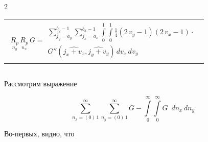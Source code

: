 \documentclass[twoside, 10pt]{article}
\def\myvspacebeforesubsection{-2.0mm}
\def\myvspaceaftersubsection{-2.5mm}
\begin{document}
\begin{multicols}{2}
\begin{center}
\begin{tabular}{ l }


$\begin{array}{lr}
\underset{n_y}{R_{p}}\,\underset{n_x}{R_{p}}\,G =
\begin{array}{c}
 \sum\limits_{j_{y}=a_{y}}^{b_{y} - 1} \sum\limits_{j_{x}=a_{x}}^{b_{x} - 1} \int\limits_{0}^{1} \int\limits_{0}^{1}\frac{1}{4} \left(2 \, v_{y} - 1\right)  \left(2 \, v_{x} - 1\right) \cdot \\
G''\left(\widehat{j_{x} + v_{x}}, \widehat{j_{y} + v_{y}}\right)\,{d v_{x}}\,{d v_{y}}
\end{array}
\end{array}$ \\



\end{tabular}
\end{center}


\vspace{\myvspacebeforesubsection}
    \subsection*{}\label{a-way-of-calculating-deltaleftevright}
\vspace{\myvspaceaftersubsection}


    Рассмотрим выражение

\begin{equation} \label{eq:12}
\sum\limits_{n_x=\left(0\right)\,1}^{\infty}
\sum\limits_{n_y=\left(0\right)\,1}^{\infty}
G%
-
\int\limits_{0}^{\infty}
\int\limits_{0}^{\infty}
G%
\,\,\,d{n_x}\,d{n_y}
\end{equation}

    Во-первых, видно, что


\end{multicols}
\end{document}
